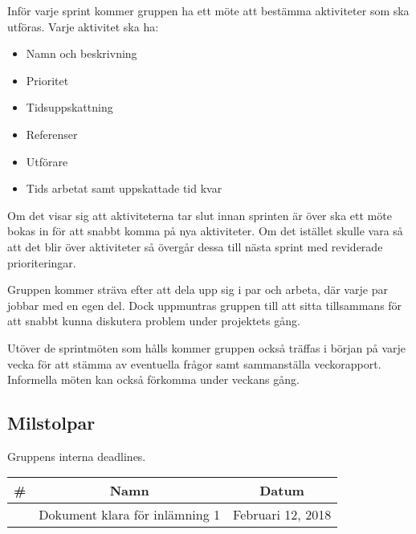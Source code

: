 Inför varje sprint kommer gruppen ha ett möte att bestämma aktiviteter som ska utföras. Varje aktivitet ska ha: \begin{itemize}
    \item Namn och beskrivning
    \item Prioritet
    \item Tidsuppskattning
    \item Referenser
    \item Utförare
    \item Tids arbetat samt uppskattade tid kvar
\end{itemize}
Om det visar sig att aktiviteterna tar slut innan sprinten är över ska ett möte bokas in för att snabbt komma på nya aktiviteter. Om det istället skulle vara så att det blir över aktiviteter så övergår dessa till nästa sprint med reviderade prioriteringar.

Gruppen kommer sträva efter att dela upp sig i par och arbeta, där varje par jobbar med en egen del. Dock uppmuntras
gruppen till att sitta tillsammans för att snabbt kunna diskutera problem under projektets gång.

Utöver de sprintmöten som hålls kommer gruppen också träffas i början på varje vecka för att stämma av eventuella frågor samt sammanställa veckorapport. Informella möten kan också förkomma under veckans gång.

\subsection{Milstolpar}
Gruppens interna deadlines.

\begin{center}
    \begin{tabular}{| c | c | c | }
        \hline
        \textbf{\#} & \textbf{Namn} & \textbf{Datum} \\
        \hline
        \centering 1 & Dokument klara för inlämning 1 & Februari 12, 2018\\
        \hline
    \end{tabular}
\end{center}

